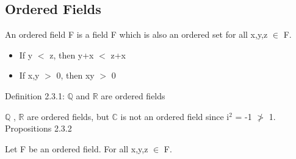 \subsection{Ordered Fields}

	\hspace{1cm}
	An ordered field F is a field F which is also an ordered set
	for all x,y,z $\in$ F.

	\begin{itemize}[leftmargin=2cm, itemsep=0.1cm]
		\item If y $<$ z, then y+x $<$ z+x
	
		\item If x,y $>$ 0, then xy $>$ 0
	\end{itemize}

\newpage

{ \color{blue} Definition 2.3.1: $\mathbb{Q}$ and $\mathbb{R}$ are ordered fields } 

	\hspace{1cm}
	$ \mathbb{Q} $ , $ \mathbb{R} $ are ordered fields,
	but $ \mathbb{C} $ is not an ordered field since i$^2$ = -1 $\not >$ 1. \\

{ \color{blue} Propositions 2.3.2} 

	\hspace{1cm}
	Let F be an ordered field. For all x,y,z $\in$ F.

